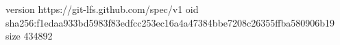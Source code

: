 version https://git-lfs.github.com/spec/v1
oid sha256:f1edaa933bd5983f83edfcc253ec16a4a47384bbe7208c26355ffba580906b19
size 434892

